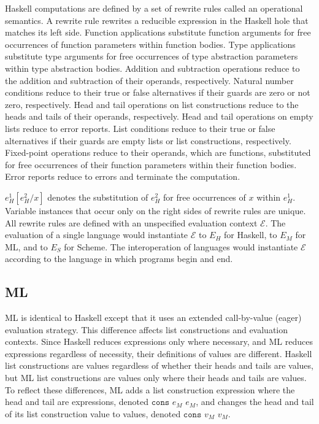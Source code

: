 Haskell computations are defined by a set of rewrite rules called an operational semantics.  A rewrite rule rewrites a reducible expression in the Haskell hole that matches its left side.  Function applications substitute function arguments for free occurrences of function parameters within function bodies.  Type applications substitute type arguments for free occurrences of type abstraction parameters within type abstraction bodies.  Addition and subtraction operations reduce to the addition and subtraction of their operands, respectively.  Natural number conditions reduce to their true or false alternatives if their guards are zero or not zero, respectively.  Head and tail operations on list constructions reduce to the heads and tails of their operands, respectively.  Head and tail operations on empty lists reduce to error reports.  List conditions reduce to their true or false alternatives if their guards are empty lists or list constructions, respectively.  Fixed-point operations reduce to their operands, which are functions, substituted for free occurrences of their function parameters within their function bodies.  Error reports reduce to errors and terminate the computation.

$e_{H}^{1}[e_{H}^{2}/x]$ denotes the substitution of $e_{H}^{2}$ for free occurrences of $x$ within $e_{H}^{1}$.  Variable instances that occur only on the right sides of rewrite rules are unique.  All rewrite rules are defined with an unspecified evaluation context $\mathscr{E}$.  The evaluation of a single language would instantiate $\mathscr{E}$ to $E_{H}$ for Haskell, to $E_{M}$ for ML, and to $E_{S}$ for Scheme.  The interoperation of languages would instantiate $\mathscr{E}$ according to the language in which programs begin and end.

\subsection{ML}

ML is identical to Haskell except that it uses an extended call-by-value (eager) evaluation strategy.  This difference affects list constructions and evaluation contexts.  Since Haskell reduces expressions only where necessary, and ML reduces expressions regardless of necessity, their definitions of values are different.  Haskell list constructions are values regardless of whether their heads and tails are values, but ML list constructions are values only where their heads and tails are values.  To reflect these differences, ML adds a list construction expression where the head and tail are expressions, denoted $\mathtt{cons}$ $e_{M}$ $e_{M}$, and changes the head and tail of its list construction value to values, denoted $\mathtt{cons}$ $v_{M}$ $v_{M}$.

